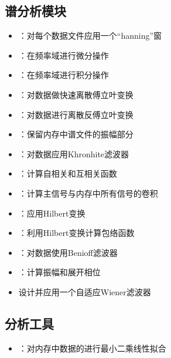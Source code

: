 \subsection*{谱分析模块}
\begin{itemize}
\item {}：对每个数据文件应用一个``hanning''窗
\item {}：在频率域进行微分操作
\item {}：在频率域进行积分操作
\item {}：对数据做快速离散傅立叶变换
\item {}：对数据进行离散反傅立叶变换
\item {}：保留内存中谱文件的振幅部分
\item {}：对数据应用Khronhite滤波器
\item {}：计算自相关和互相关函数
\item {}：计算主信号与内存中所有信号的卷积
\item {}：应用Hilbert变换
\item {}：利用Hilbert变换计算包络函数
\item {}：对数据使用Benioff滤波器
\item {}：计算振幅和展开相位
\item {}设计并应用一个自适应Wiener滤波器
\end{itemize}

\subsection*{分析工具}
\begin{itemize}
\item {}：对内存中数据的进行最小二乘线性拟合
\end{itemize}

\newpage
